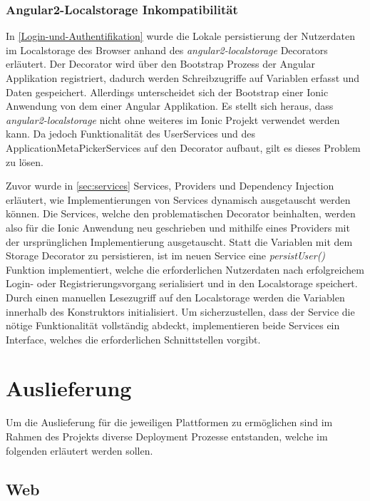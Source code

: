 \subsubsection{Angular2-Localstorage Inkompatibilität}
In \ref{Login-und-Authentifikation} wurde die Lokale persistierung der Nutzerdaten im Localstorage
des Browser anhand des \emph{angular2-localstorage} Decorators erläutert.
Der Decorator wird über den Bootstrap Prozess der Angular Applikation registriert,
dadurch werden Schreibzugriffe auf Variablen erfasst und Daten gespeichert.
Allerdings unterscheidet sich der Bootstrap einer Ionic Anwendung von dem einer Angular Applikation.
Es stellt sich heraus, dass \emph{angular2-localstorage} nicht ohne weiteres im Ionic Projekt verwendet werden kann.
Da jedoch Funktionalität des UserServices und des ApplicationMetaPickerServices auf den Decorator aufbaut,
gilt es dieses Problem zu lösen.

Zuvor wurde in \ref{sec:services} Services, Providers und Dependency Injection erläutert, wie
Implementierungen von Services dynamisch ausgetauscht werden können.
Die Services, welche den problematischen Decorator beinhalten, werden also für die Ionic Anwendung neu geschrieben
und mithilfe eines Providers mit der ursprünglichen Implementierung ausgetauscht.
Statt die Variablen mit dem Storage Decorator zu persistieren, ist im neuen Service eine \emph{persistUser()} Funktion implementiert, welche die erforderlichen Nutzerdaten nach
erfolgreichem Login- oder Registrierungsvorgang serialisiert und in den Localstorage speichert.
Durch einen manuellen Lesezugriff auf den Localstorage werden die Variablen innerhalb des Konstruktors initialisiert.
Um sicherzustellen, dass der Service die nötige Funktionalität vollständig abdeckt, implementieren beide Services ein Interface,
welches die erforderlichen Schnittstellen vorgibt.



\newpage
\section{Auslieferung}

Um die Auslieferung für die jeweiligen Plattformen zu ermöglichen
sind im Rahmen des Projekts \projectname{} diverse Deployment Prozesse entstanden,
welche im folgenden erläutert werden sollen.

\subsection{Web}
\label{deployment-web}

